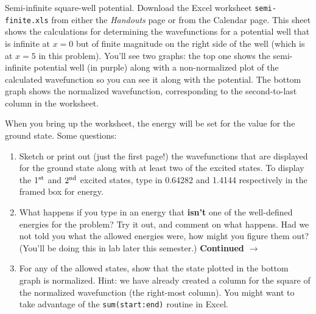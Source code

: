 \begin{aproblem}{Semi-infinite square-well potential.} 
  Download the Excel worksheet \verb+semi-finite.xls+ from either the
  {\it Handouts} page or from the Calendar page.  This sheet shows the
  calculations for determining the wavefunctions for a potential well
  that is infinite at $x=0$ but of finite magnitude on the right side
  of the well (which is at $x=5$ in this problem).  You'll see two
  graphs: the top one shows the semi-infinite potential well (in
  purple) along with a non-normalized plot of the calculated
  wavefunction so you can see it along with the potential.  The bottom
  graph shows the normalized wavefunction, corresponding to the
  second-to-last column in the worksheet.

  When you bring up the worksheet, the energy will be set for the
  value for the ground state.  Some questions:

  \begin{enumerate}

  \item Sketch or print out (just the first page!) the wavefunctions
    that are displayed for the ground state along with at least two of
    the excited states.  To display the 1$^{\rm st}$ and $2^{\rm nd}$
    excited states, type in 0.64282 and 1.4144 respectively in the
    framed box for energy.

  \item What happens if you type in an energy that {\bf isn't} one of
    the well-defined energies for the problem?  Try it out, and
    comment on what happens.  Had we not told you what the allowed
    energies were, how might you figure them out?  (You'll be doing
    this in lab later this semester.)  {\bf Continued} $\rightarrow$

  \item For any of the allowed states, show that the state plotted in
    the bottom graph is normalized.  Hint: we have already created a
    column for the square of the normalized wavefunction (the
    right-most column).  You might want to take advantage of the
    \verb+sum(start:end)+ routine in Excel.

  \end{enumerate}
\end{aproblem}

